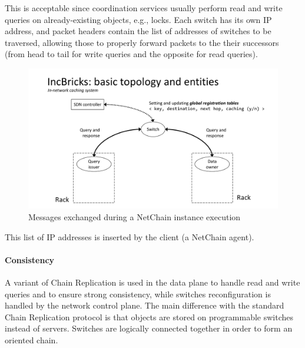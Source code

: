 This is acceptable since coordination services usually perform read and write queries on already-existing objects, e.g., locks.
Each switch has its own IP address, and packet headers contain the list of addresses of switches to be traversed, allowing those to properly forward packets to the their successors (from head to tail for write queries and the opposite for read queries).
\begin{figure}[!htb]
    \centering
        \includegraphics[page=8, clip, trim=6.5cm 0.1cm 6.4cm 0.1cm, width=1.00\textwidth]{figures/analysis/inp/solutions.pdf}
    \caption{Messages exchanged during a NetChain \texorpdfstring{\cite{netchain}}{} instance execution}
\end{figure}
This list of IP addresses is inserted by the client (a NetChain \cite{netchain} agent).

\paragraph{Consistency}
A variant of Chain Replication \cite{chainreplication} is used in the data plane to handle read and write queries and to ensure strong consistency, while switches reconfiguration is handled by the network control plane.
The main difference with the standard Chain Replication \cite{chainreplication} protocol is that objects are stored on programmable switches instead of servers.
Switches are logically connected together in order to form an oriented chain.

